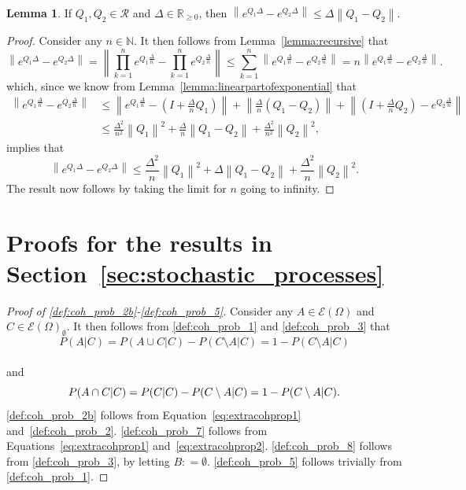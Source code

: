 \documentclass[10pt,a4paper]{paper}
\theoremstyle{definition}
\newtheorem{lemma}[theorem]{Lemma}
\newcommand{\nats}{\mathbb{N}}
\newcommand{\reals}{\mathbb{R}}
\newcommand{\realsnonneg}{\reals_{\geq 0}}
\newcommand{\paths}{\Omega}
\newcommand{\power}{\mathcal{E}(\paths)}
\newcommand{\nonemptypower}{\power_{\emptyset}}
\newcommand{\norm}[1]{\left\lVert #1 \right\rVert}
\newcommand{\coloneqq}{:\!=}
\begin{document}
\begin{lemma}\label{lemma:differencebetweenexponentials}
If $Q_1,Q_2\in\mathcal{R}$ and $\Delta\in\realsnonneg$, then $\norm{e^{Q_1\Delta}-e^{Q_2\Delta}}\leq\Delta\norm{Q_1-Q_2}$.
\end{lemma}
\begin{proof}
Consider any $n\in\nats$. It then follows from Lemma~\ref{lemma:recursive} that
\begin{equation*}
\norm{e^{Q_1\Delta}-e^{Q_2\Delta}}
=\norm{\prod_{k=1}^n e^{Q_1\frac{\Delta}{n}}-\prod_{k=1}^n e^{Q_2\frac{\Delta}{n}}}
\leq\sum_{k=1}^n\norm{e^{Q_1\frac{\Delta}{n}}-e^{Q_2\frac{\Delta}{n}}}
=
n\norm{e^{Q_1\frac{\Delta}{n}}-e^{Q_2\frac{\Delta}{n}}}.
\end{equation*}
which, since we know from Lemma~\ref{lemma:linearpartofexponential} that
\begin{align*}
\norm{e^{Q_1\frac{\Delta}{n}}-e^{Q_2\frac{\Delta}{n}}}
&\leq
\norm{e^{Q_1\frac{\Delta}{n}}-(I+\frac{\Delta}{n}Q_1)}
+
\norm{\frac{\Delta}{n}(Q_1-Q_2)}
+\norm{(I+\frac{\Delta}{n}Q_2)-e^{Q_2\frac{\Delta}{n}}}\\
&\leq\frac{\Delta^2}{n^2}\norm{Q_1}^2
+
\frac{\Delta}{n}\norm{Q_1-Q_2}
+
\frac{\Delta^2}{n^2}\norm{Q_2}^2,
\end{align*}
implies that
\begin{equation*}
\norm{e^{Q_1\Delta}-e^{Q_2\Delta}}
\leq
\frac{\Delta^2}{n}\norm{Q_1}^2
+
\Delta\norm{Q_1-Q_2}
+
\frac{\Delta^2}{n}\norm{Q_2}^2.
\end{equation*}
The result now follows by taking the limit for $n$ going to infinity.
\end{proof}

\section{Proofs for the results in Section~\ref{sec:stochastic_processes}}\label{app:stoch_proc}

\begin{proof}[Proof of \ref{def:coh_prob_2b}-\ref{def:coh_prob_5}]
Consider any $A\in\power$ and $C\in\nonemptypower$. It then follows from \ref{def:coh_prob_1} and \ref{def:coh_prob_3} that
\vspace{-7pt}
\begin{equation}\label{eq:extracohprop1}
P(A\vert C)
=P(A\cup C\vert C)-P(C\setminus A\vert C)
=1-P(C\setminus A\vert C)
\end{equation}\\[-20pt]
and
\begin{equation}\label{eq:extracohprop2}
P(A\cap C\vert C)
=P(C\vert C)-P(C\setminus A\vert C)
=1-P(C\setminus A\vert C).
\vspace{6pt}
\end{equation}
\ref{def:coh_prob_2b} follows from Equation~\eqref{eq:extracohprop1} and~\ref{def:coh_prob_2}. \ref{def:coh_prob_7} follows from Equations~\eqref{eq:extracohprop1} and~\eqref{eq:extracohprop2}. \ref{def:coh_prob_8} follows from \ref{def:coh_prob_3}, by letting $B\coloneqq\emptyset$. \ref{def:coh_prob_5} follows trivially from \ref{def:coh_prob_1}.
\end{proof}
\end{document}
